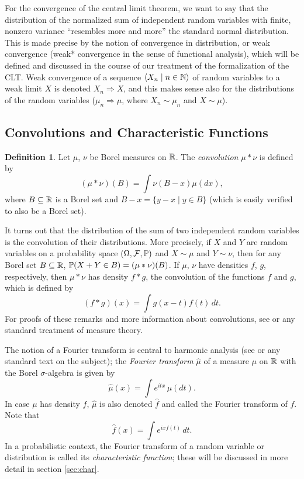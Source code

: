 \documentclass[leqno]{article}
\theoremstyle{definition}
\newtheorem{definition}[theorem]{Definition}
\newcommand{\bldset}[2]{\{{#1}\mid{#2}\}}
\newcommand{\bldseq}[2]{\langle{#1}\mid{#2}\rangle}
\begin{document}
For the convergence of the central limit theorem, we want to say that the distribution of the normalized sum of independent random variables with finite, nonzero variance ``resembles more and more'' the standard normal distribution. This is made precise by the notion of convergence in distribution, or weak convergence (weak* convergence in the sense of functional analysis), which will be defined and discussed in the course of our treatment of the formalization of the CLT. Weak convergence of a sequence $\bldseq{X_n}{n \in \N}$ of random variables to a weak limit $X$ is denoted $X_n \Rightarrow X$, and this makes sense also for the distributions of the random variables ($\mu_n \Rightarrow \mu$, where $X_n \sim \mu_n$ and $X \sim \mu$).

\subsection{Convolutions and Characteristic Functions}

\begin{definition}
Let $\mu$, $\nu$ be Borel measures on $\R$. The {\em convolution} $\mu * \nu$ is defined by
\[ (\mu * \nu)(B) = \int \nu(B - x) \mu(dx), \]
where $B \subseteq \R$ is a Borel set and $B - x = \bldset{y - x}{y \in B}$ (which is easily verified to also be a Borel set).
\end{definition}

It turns out that the distribution of the sum of two independent random variables is the convolution of their distributions. More precisely, if $X$ and $Y$ are random variables on a probability space $(\Omega, \mathcal F, \P)$ and $X \sim \mu$ and $Y \sim \nu$, then for any Borel set $B \subseteq \R$,
$\P(X + Y \in B) = (\mu * \nu)(B)$. If $\mu$, $\nu$ have densities $f$, $g$, respectively, then $\mu * \nu$ has density $f * g$, the convolution of the functions $f$ and $g$, which is defined by
\[ (f * g)(x) = \int g(x - t) f(t) \, dt. \]
For proofs of these remarks and more information about convolutions, see \cite{billingsley} or any standard treatment of measure theory.

The notion of a Fourier transform is central to harmonic analysis (see \cite{katznelson} or any standard text on the subject); the {\em Fourier transform} $\hat \mu$ of a measure $\mu$ on $\R$ with the Borel $\sigma$-algebra is given by
\[ \hat \mu (x) = \int e^{itx} \, \mu(dt). \]
In case $\mu$ has density $f$, $\hat \mu$ is also denoted $\hat f$ and called the Fourier transform of $f$. Note that
\[ \hat f(x) = \int e^{ix f(t)} \, dt. \]
In a probabilistic context, the Fourier transform of a random variable or distribution is called its {\em characteristic function}; these will be discussed in more detail in section \ref{sec:char}.
\end{document}
